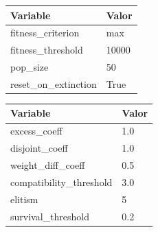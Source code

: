 \documentclass[conference]{IEEEtran}
\begin{document}
\renewcommand{\thetable}{S\arabic{table}}
\begin{table}
    \centering
    \label{tab:NEAT}
    \begin{tabular}{ll}
    \toprule
    \textbf{Variable} & \textbf{Valor} \\
    \midrule
    fitness\_criterion     & max \\
    fitness\_threshold     & 10000 \\
    pop\_size              & 50 \\
    reset\_on\_extinction  & True  \\
    \bottomrule
    \end{tabular}
    \vspace{0.5cm}
    
    \label{tab:DefaultReproduction}
    \begin{tabular}{ll}
    \toprule
    \textbf{Variable} & \textbf{Valor} \\
    \midrule
    excess\_coeff            & 1.0 \\
    disjoint\_coeff          & 1.0 \\
    weight\_diff\_coeff      & 0.5 \\
    compatibility\_threshold & 3.0 \\
    elitism                  & 5 \\
    survival\_threshold      & 0.2 \\
    \bottomrule
    \end{tabular}
    \vspace{0.5cm}
\end{table}
\end{document}
